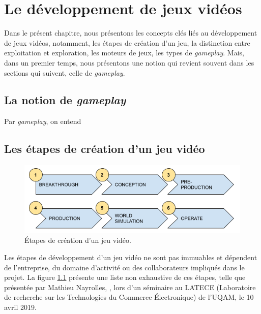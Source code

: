 \chapter{Le développement de jeux vidéos}

\label{jvL.sect}
Dans le pr\'esent chapitre, nous pr\'esentons les concepts cl\'es
li\'es au d\'eveloppement de jeux vid\'eos, notamment, les \'etapes de
cr\'eation d'un jeu, la distinction entre exploitation et exploration,
les moteurs de jeux, les types de \emph{gameplay}.
%
Mais, dans un premier temps, nous pr\'esentons une notion qui revient
souvent dans les sections qui suivent, celle de \emph{gameplay}.



\section{La notion de \emph{gameplay}}


Par \emph{gameplay}, on entend 



\section{Les étapes de création d'un jeu vid\'eo}
\begin{figure}[H]
    \centering
    \includegraphics[width=14cm]{10_img/production_stages.png} 
    \caption{Étapes de création d'un jeu vidéo.}
    \label{fig.etapes}
\end{figure}

Les étapes de développement d'un jeu vidéo ne sont pas immuables et dépendent de l'entreprise, du domaine d'activité ou des collaborateurs impliqués dans le projet.
La figure \ref{fig.etapes} présente une liste non exhaustive de ces étapes, telle que présentée par Mathieu Nayrolles, , lors d’un séminaire au LATECE (Laboratoire de recherche sur les Technologies du Commerce Électronique) de l’UQAM, le 10 avril 2019.




